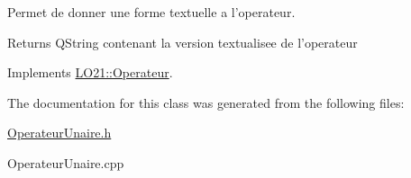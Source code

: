 \-Permet de donner une forme textuelle a l'operateur. 

\begin{DoxyReturn}{\-Returns}
\-Q\-String contenant la version textualisee de l'operateur 
\end{DoxyReturn}


\-Implements \hyperlink{class_l_o21_1_1_operateur_a145a86591719c4c74043b05b21722b6e}{\-L\-O21\-::\-Operateur}.



\-The documentation for this class was generated from the following files\-:\begin{DoxyCompactItemize}
\item 
\hyperlink{_operateur_unaire_8h}{\-Operateur\-Unaire.\-h}\item 
\-Operateur\-Unaire.\-cpp\end{DoxyCompactItemize}
